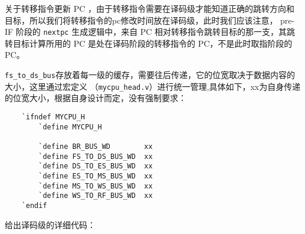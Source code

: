 关于转移指令更新 PC ，由于转移指令需要在译码级才能知道正确的跳转方向和目标，所以我们将转移指令的pc修改时间放在译码级，此时我们应该注意，
pre-IF 阶段的 \texttt{nextpc} 生成逻辑中，来自 PC 相对转移指令跳转目标的那一支，其跳转目标计算所用的 PC 是处在译码阶段的转移指令的 PC，不是此时取指阶段的PC。

\texttt{fs\_to\_ds\_bus}存放着每一级的缓存，需要往后传递，它的位宽取决于数据内容的大小，这里通过宏定义
（\texttt{mycpu\_head.v}）进行统一管理,具体如下，xx为自身传递的位宽大小，根据自身设计而定，没有强制要求：

\begin{lstlisting}
    `ifndef MYCPU_H
        `define MYCPU_H

        `define BR_BUS_WD        xx
        `define FS_TO_DS_BUS_WD  xx
        `define DS_TO_ES_BUS_WD  xx
        `define ES_TO_MS_BUS_WD  xx
        `define MS_TO_WS_BUS_WD  xx
        `define WS_TO_RF_BUS_WD  xx
    `endif
\end{lstlisting}

给出译码级的详细代码：

